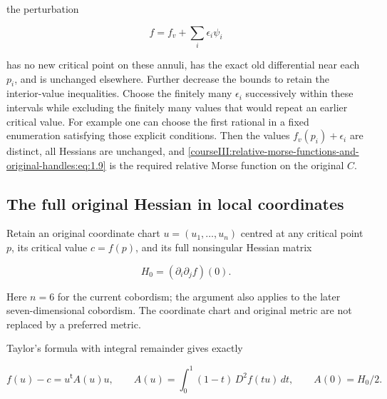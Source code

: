the perturbation

\begin{equation}
f=f_v+\sum_i\epsilon_i\psi_i
\label{courseIII:relative-morse-functions-and-original-handles:eq:1.9}
\end{equation}

has no new critical point on these annuli, has the exact old differential near each \(p_i\), and is unchanged elsewhere. Further decrease the bounds to retain the interior-value inequalities. Choose the finitely many \(\epsilon_i\) successively within these intervals while excluding the finitely many values that would repeat an earlier critical value. For example one can choose the first rational in a fixed enumeration satisfying those explicit conditions. Then the values \(f_v(p_i)+\epsilon_i\) are distinct, all Hessians are unchanged, and \eqref{courseIII:relative-morse-functions-and-original-handles:eq:1.9} is the required relative Morse function on the original \(C\).

\subsection{The full original Hessian in local coordinates}
\label{courseIII:relative-morse-functions-and-original-handles:relative-morse-hessian}

\label{courseIII:relative-morse-functions-and-original-handles:section-2}\label{courseIII:relative-morse:2}

Retain an original coordinate chart \(u=(u_1,\ldots,u_n)\) centred at any critical point \(p\), its critical value \(c=f(p)\), and its full nonsingular Hessian matrix

\begin{equation}
H_0=(\partial_i\partial_j f)(0).
\label{courseIII:relative-morse-functions-and-original-handles:eq:2.1}
\end{equation}

Here \(n=6\) for the current cobordism; the argument also applies to the later seven-dimensional cobordism. The coordinate chart and original metric are not replaced by a preferred metric.

Taylor's formula with integral remainder gives exactly

\begin{equation}
f(u)-c=u^{\mathsf t}A(u)u,\qquad
A(u)=\int_0^1(1-t)\,D^2f(tu)\,dt,\qquad A(0)=H_0/2.
\label{courseIII:relative-morse-functions-and-original-handles:eq:2.2}
\end{equation}

